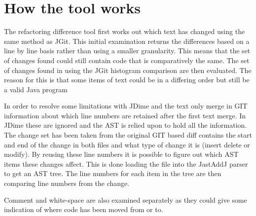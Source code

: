 
\section{How the tool works}

The refactoring difference tool first works out which text has changed using the same method as JGit.
This initial examination returns the differences based on a line by line basis rather than using a smaller granularity.
This means that the set of changes found could still contain code that is comparatively the same.
The set of changes found in using the JGit histogram comparison are then evaluated.
The reason for this is that some items of text could be in a differing order but still be a valid Java program


In order to resolve some limitations with JDime and the text only merge in GIT information about which line numbers are retained after the first text merge.  In JDime these are ignored and the AST is relied upon to hold all the information.  The change set has been taken from the original GIT based diff contains the start and end of the change in both files and what type of change it is (insert delete or modify).  By reusing these line numbers it is possible to figure out which AST items these changes affect. This is done loading the file into the JastAddJ parser to get an AST tree. The line numbers for each item in the tree are then comparing line numbers from the change.



Comment and white-space are also examined separately as they could give some indication of where code has been moved from or to.

